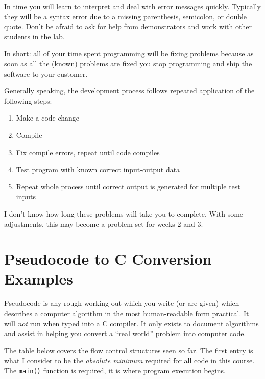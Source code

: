 \documentclass{lab}
\begin{document}
In time you will learn to interpret and deal with error messages quickly. Typically they will be a syntax error due to a missing parenthesis, semicolon, or double quote. Don't be afraid to ask for help from demonstrators and work with other students in the lab.

In short: all of your time spent programming will be fixing problems because as soon as all the (known) problems are fixed you stop programming and ship the software to your customer.

Generally speaking, the development process follows repeated application of the following steps:

\begin{enumerate}
\item Make a code change
\item Compile
\item Fix compile errors, repeat until code compiles
\item Test program with known correct input-output data
\item Repeat whole process until correct output is generated for multiple test inputs
\end{enumerate}

I don't know how long these problems will take you to complete. With some adjustments, this may become a problem set for weeks 2 and 3.

\pagebreak
\section{Pseudocode to C Conversion Examples}

Pseudocode is any rough working out which you write (or are given) which describes a computer algorithm in the most human-readable form practical. It will \textit{not} run when typed into a C compiler. It only exists to document algorithms and assist in helping you convert a ``real world'' problem into computer code.

The table below covers the flow control structures seen so far. The first entry is what I consider to be the \textit{absolute minimum} required for all code in this course. The \texttt{main()} function is required, it is where program execution begins.
\end{document}
